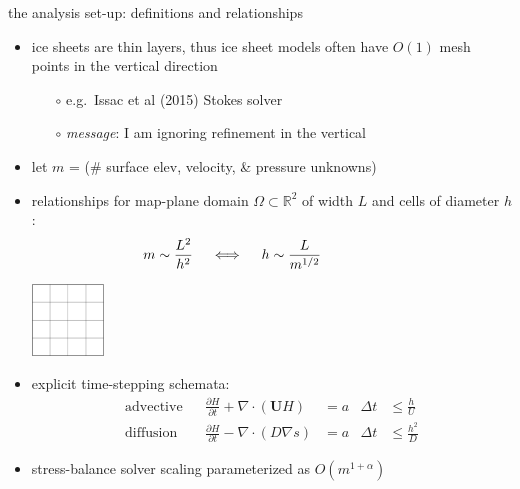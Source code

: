 \documentclass[svgnames,
               hyperref={colorlinks,citecolor=DeepPink4,linkcolor=FireBrick,urlcolor=Maroon},
               usepdftitle=false]  %
               {beamer}
\newcommand{\RR}{\mathbb{R}}
\newcommand{\grad}{\nabla}
\newcommand{\bU}{\mathbf{U}}
\begin{document}
\begin{frame}{the analysis set-up: definitions and relationships}

\begin{itemize}
\item ice sheets are thin layers, thus ice sheet models often have $O(1)$ mesh points in the vertical direction
    \begin{itemize}
    \item[$\circ$] e.g.~Issac et al (2015) Stokes solver
    \item[$\circ$] \emph{message}: I am ignoring refinement in the vertical
    \end{itemize}

\medskip
\item let $m$ = (\# surface elev, velocity, \& pressure unknowns)
\item relationships for map-plane domain $\Omega \subset \RR^2$ of width $L$ and cells of diameter $h$:
  $$m \sim \frac{L^2}{h^2}  \quad \iff \quad h \sim \frac{L}{m^{1/2}} \hspace{20mm}$$

\vspace{-18mm}
\hfill \includegraphics[width=0.15\textwidth]{images/one-grid.png} \hspace{5mm}

\item explicit time-stepping schemata:
{\footnotesize
\begin{align*}
\text{advective} && \frac{\partial H}{\partial t} + \nabla \cdot \left(\bU H\right) &= a & \Delta t &\le \frac{h}{U} \\
\text{diffusion} && \frac{\partial H}{\partial t} - \nabla \cdot \left(D \grad s\right) &= a & \Delta t &\le \frac{h^2}{D}
\end{align*}
}

\item stress-balance solver scaling parameterized as $O(m^{1+\alpha})$
\end{itemize}
\end{frame}
\end{document}
